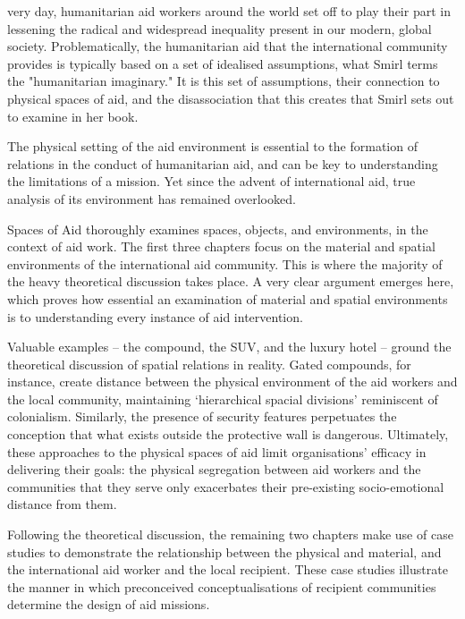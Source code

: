 
{\flushright{}}
\smallskip

   very day, humanitarian aid workers around the world set off to play
   their part in lessening the radical and widespread inequality present
   in our modern, global society. Problematically, the humanitarian aid
   that the international community  provides is typically based on a set
   of idealised assumptions, what Smirl terms the "humanitarian
   imaginary." It is this set of assumptions, their connection to physical
   spaces of aid, and the disassociation that this creates that Smirl sets
   out to examine in her book.

   The physical setting of the aid environment is essential to the
   formation of relations in the conduct of humanitarian aid, and can be
   key to understanding the limitations of a mission. Yet since the advent
   of international aid, true analysis of its environment has remained
   overlooked.

   Spaces of Aid thoroughly examines spaces, objects, and environments, in
   the context of aid work. The first three chapters focus on the material
   and spatial environments of the international aid community. This is
   where the majority of the heavy theoretical discussion takes place. A
   very clear argument emerges here, which proves how essential an
   examination of material and spatial environments is to understanding
   every instance of aid intervention.

   Valuable examples -- the compound, the SUV, and the luxury hotel --
   ground the theoretical discussion of spatial relations in reality.
   Gated compounds, for instance, create distance between the physical
   environment of the aid workers and the local community, maintaining
   `hierarchical spacial divisions' reminiscent of colonialism. Similarly,
   the presence of security features perpetuates the conception that what
   exists outside the protective wall is dangerous. Ultimately, these
   approaches to the physical spaces of aid limit organisations' efficacy
   in delivering their goals: the physical segregation between aid workers
   and the communities that they serve only exacerbates their pre-existing
   socio-emotional distance from them.

   Following the theoretical discussion, the remaining two chapters make
   use of case studies to demonstrate the relationship between the
   physical and material, and the international aid worker and the local
   recipient. These case studies illustrate the manner in which
   preconceived conceptualisations of recipient communities determine the
   design of aid missions.

